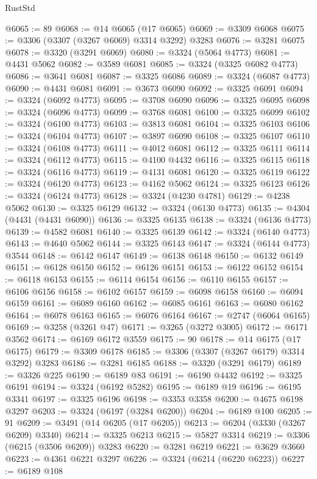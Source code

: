 \begin{lexlean}{RustStd}
\begin{coremodule}
@6065 := 89
@6068 := @14 @6065 (@17 @6065)
@6069 := @3309 @6068
@6075 := @3306 (@3307 (@3267 @6069) @3314 @3292) @3283
@6076 := @3281 @6075
@6078 := @3320 (@3291 @6069)
@6080 := @3324 (@5064 @4773)
@6081 := @4431 @5062
@6082 := @3589 @6081
@6085 := @3324 (@3325 @6082 @4773)
@6086 := @3641 @6081
@6087 := @3325 @6086
@6089 := @3324 (@6087 @4773)
@6090 := @4431 @6081
@6091 := @3673 @6090
@6092 := @3325 @6091
@6094 := @3324 (@6092 @4773)
@6095 := @3708 @6090
@6096 := @3325 @6095
@6098 := @3324 (@6096 @4773)
@6099 := @3768 @6081
@6100 := @3325 @6099
@6102 := @3324 (@6100 @4773)
@6103 := @3813 @6081
@6104 := @3325 @6103
@6106 := @3324 (@6104 @4773)
@6107 := @3897 @6090
@6108 := @3325 @6107
@6110 := @3324 (@6108 @4773)
@6111 := @4012 @6081
@6112 := @3325 @6111
@6114 := @3324 (@6112 @4773)
@6115 := @4100 @4432
@6116 := @3325 @6115
@6118 := @3324 (@6116 @4773)
@6119 := @4131 @6081
@6120 := @3325 @6119
@6122 := @3324 (@6120 @4773)
@6123 := @4162 @5062
@6124 := @3325 @6123
@6126 := @3324 (@6124 @4773)
@6128 := @3324 (@4230 @4781)
@6129 := @4238 @5062
@6130 := @3325 @6129
@6132 := @3324 (@6130 @4773)
@6135 := @4304 (@4431 (@4431 @6090))
@6136 := @3325 @6135
@6138 := @3324 (@6136 @4773)
@6139 := @4582 @6081
@6140 := @3325 @6139
@6142 := @3324 (@6140 @4773)
@6143 := @4640 @5062
@6144 := @3325 @6143
@6147 := @3324 (@6144 @4773) @3544
@6148 := @6142 @6147
@6149 := @6138 @6148
@6150 := @6132 @6149
@6151 := @6128 @6150
@6152 := @6126 @6151
@6153 := @6122 @6152
@6154 := @6118 @6153
@6155 := @6114 @6154
@6156 := @6110 @6155
@6157 := @6106 @6156
@6158 := @6102 @6157
@6159 := @6098 @6158
@6160 := @6094 @6159
@6161 := @6089 @6160
@6162 := @6085 @6161
@6163 := @6080 @6162
@6164 := @6078 @6163
@6165 := @6076 @6164
@6167 := @2747 (@6064 @6165)
@6169 := @3258 (@3261 @47)
@6171 := @3265 (@3272 @3005)
@6172 := @6171 @3562
@6174 := @6169 @6172 @3559
@6175 := 90
@6178 := @14 @6175 (@17 @6175)
@6179 := @3309 @6178
@6185 := @3306 (@3307 (@3267 @6179) @3314 @3292) @3283
@6186 := @3281 @6185
@6188 := @3320 (@3291 @6179)
@6189 := @3326 @225
@6190 := @6189 @83
@6191 := @6190 @4432
@6192 := @3325 @6191
@6194 := @3324 (@6192 @5282)
@6195 := @6189 @19
@6196 := @6195 @3341
@6197 := @3325 @6196
@6198 := @3353 @3358
@6200 := @4675 @6198 @3297
@6203 := @3324 (@6197 (@3284 @6200))
@6204 := @6189 @100
@6205 := 91
@6209 := @3491 (@14 @6205 (@17 @6205))
@6213 := @6204 (@3330 (@3267 @6209) @3340)
@6214 := @3325 @6213
@6215 := @5827 @3314
@6219 := @3306 (@6215 (@3506 @6209)) @3283
@6220 := @3281 @6219
@6221 := @3629 @3660
@6223 := @4361 @6221 @3297
@6226 := @3324 (@6214 (@6220 @6223))
@6227 := @6189 @108

\end{coremodule}
\end{lexlean}

